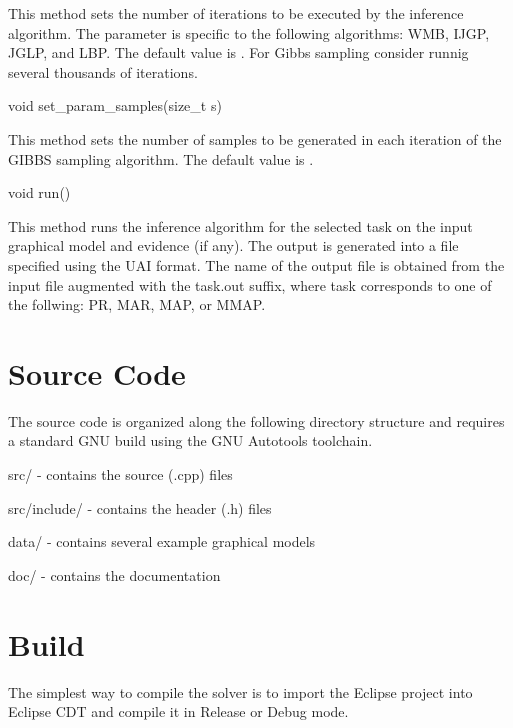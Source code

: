 \begin{DoxyItemize}
\begin{DoxyVerb}
\end{DoxyVerb}
 This method sets the number of iterations to be executed by the inference algorithm. The parameter is specific to the following algorithms\+: {\ttfamily W\+MB}, {\ttfamily I\+J\+GP}, {\ttfamily J\+G\+LP}, and {\ttfamily L\+BP}. The default value is {}. For Gibbs sampling consider runnig several thousands of iterations. \begin{DoxyVerb}    void set_param_samples(size_t s)
\end{DoxyVerb}
 This method sets the number of samples to be generated in each iteration of the {\ttfamily G\+I\+B\+BS} sampling algorithm. The default value is {}. \begin{DoxyVerb}    void run()
\end{DoxyVerb}
 This method runs the inference algorithm for the selected task on the input graphical model and evidence (if any). The output is generated into a file specified using the U\+AI format. The name of the output file is obtained from the input file augmented with the {\ttfamily task.\+out} suffix, where {\ttfamily task} corresponds to one of the follwing\+: {\ttfamily PR}, {\ttfamily M\+AR}, {\ttfamily M\+AP}, or {\ttfamily M\+M\+AP}.
\end{DoxyItemize}

\section*{Source Code}

The source code is organized along the following directory structure and requires a standard G\+NU build using the G\+NU Autotools toolchain.


\begin{DoxyItemize}
\item {\ttfamily src/} -\/ contains the source (.cpp) files
\item {\ttfamily src/include/} -\/ contains the header (.h) files
\item {\ttfamily data/} -\/ contains several example graphical models
\item {\ttfamily doc/} -\/ contains the documentation
\end{DoxyItemize}

\section*{Build}

The simplest way to compile the solver is to import the Eclipse project into Eclipse C\+DT and compile it in Release or Debug mode.

